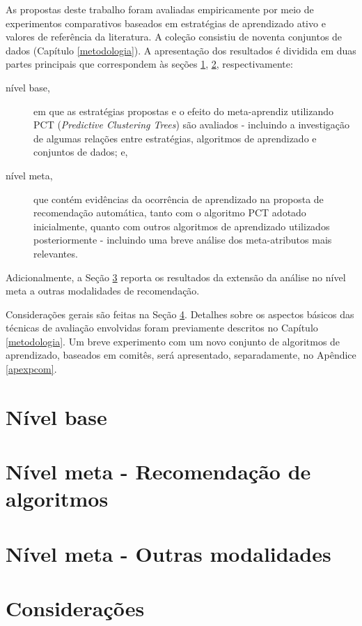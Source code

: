 As propostas deste trabalho foram avaliadas empiricamente por meio de experimentos comparativos baseados em estratégias de aprendizado ativo e valores de referência da literatura.
A coleção consistiu de noventa conjuntos de dados (Capítulo \ref{metodologia}).
A apresentação dos resultados é dividida em duas partes principais que correspondem às seções \ref{expbase}, \ref{expmeta}, respectivamente:
\begin{description}
   \item [nível base,] em que as estratégias propostas e o efeito do meta-aprendiz utilizando PCT (\textit{Predictive Clustering Trees}) são avaliados - incluindo a investigação de algumas relações entre estratégias, algoritmos de aprendizado e conjuntos de dados; e,
   \item [nível meta,] que contém evidências da ocorrência de aprendizado na proposta de recomendação automática, tanto com o algoritmo PCT adotado inicialmente, quanto com outros algoritmos de aprendizado utilizados posteriormente - incluindo uma breve análise dos meta-atributos mais relevantes.
\end{description}
Adicionalmente, a Seção \ref{outmod} reporta os resultados da extensão da análise no nível meta a outras modalidades de recomendação.

Considerações gerais são feitas na Seção \ref{sintese}.
Detalhes sobre os aspectos básicos das técnicas de avaliação envolvidas foram previamente descritos no Capítulo \ref{metodologia}.
Um breve experimento com um novo conjunto de algoritmos de aprendizado, baseados em comitês, será apresentado, separadamente, no Apêndice \ref{apexpcom}.

\section{Nível base}\label{expbase}


\section{Nível meta - Recomendação de algoritmos}\label{expmeta}


\section{Nível meta - Outras modalidades}\label{outmod}


\section{Considerações}\label{sintese}
